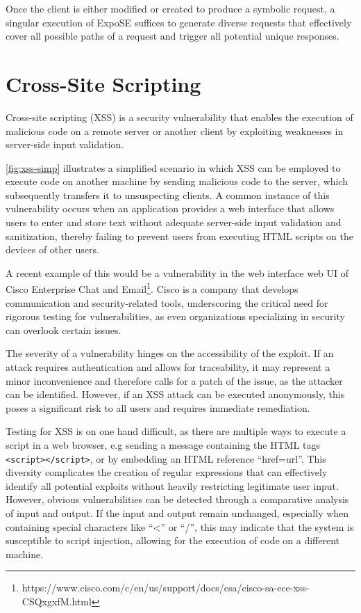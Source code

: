 Once the client is either modified or created to produce a symbolic request, 
a singular execution of ExpoSE suffices to generate diverse requests that effectively cover all
possible paths of a request and trigger all potential unique responses.




\section{Cross-Site Scripting}
\label{sec:xss}
Cross-site scripting (XSS) is a security vulnerability that enables the execution of malicious code on a remote server or
another client by exploiting weaknesses in server-side input validation. \cite{bisht_xss-guard_2008}

\autoref{fig:xss-simp} illustrates a simplified scenario in which XSS can be employed to execute code on
another machine by sending malicious code to the server, which subsequently transfers it to unsuspecting clients.
A common instance of this vulnerability occurs when an application provides a web interface that allows users
to enter and store text without adequate server-side input validation and sanitization,
thereby failing to prevent users from executing HTML scripts on the devices of other users.

A recent example of this would be a vulnerability in the web interface web UI of Cisco Enterprise Chat and 
Email\footnote{https://www.cisco.com/c/en/us/support/docs/csa/cisco-sa-ece-xss-CSQxgxfM.html}. 
Cisco is a company that develops communication and security-related tools, 
underscoring the critical need for rigorous testing for vulnerabilities,
as even organizations specializing in security can overlook certain issues.

The severity of a vulnerability hinges on the accessibility of the exploit. 
If an attack requires authentication and allows for traceability,
it may represent a minor inconvenience and therefore calls for a patch of the issue,
as the attacker can be identified. However, if an XSS attack can be executed anonymously,
this poses a significant risk to all users and requires immediate remediation.

Testing for XSS is on one hand difficult, as there are multiple ways to execute a script in a web browser,
e.g sending a message containing the HTML tags \lstinline{<script></script>}, 
or by embedding an HTML reference “href=url”. 
This diversity complicates the creation of regular expressions that can effectively identify 
all potential exploits without heavily restricting legitimate user input.
However, obvious vulnerabilities can be detected through a comparative analysis of input and output.
If the input and output remain unchanged, especially when containing special characters like “\textless” or “/”,
this may indicate that the system is susceptible to script injection, allowing for the execution of code on a different machine.


